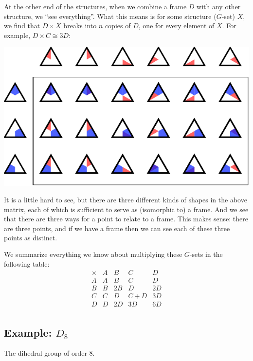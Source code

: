 \documentclass[11pt,oneside]{article}
\newcommand{\thinplus}{\!+\!}
\begin{document}
At the other end of the structures, 
when we combine a frame $D$ with any other structure,
we ``see everything''.
What this means is 
for some structure ($G$-set) $X$, we find that $D\times X$
breaks into $n$ copies of $D$, one for every element of $X$.
For example, $D\times C\cong 3D:$
\begin{center}
\includegraphics[]{pic-triangle-point-frame-matrix.pdf} 
\end{center}
It is a little hard to see, but there are three different
kinds of shapes in the above matrix, 
each of which is sufficient to serve as (isomorphic to) a frame.
And we see that there are three ways for a point to relate to
a frame. This makes sense: there are three points, and if we
have a frame then we can see each of these three points as distinct.

We summarize everything we know about 
multiplying these $G$-sets in the following table:
$$
\begin{array}{r|rrrr}
\times & A & B & C & D \\
\hline
A & A & B & C & D \\
B & B & 2B & D & 2D \\
C & C & D & C\thinplus D & 3D \\
D & D & 2D & 3D & 6D \\
\end{array}
$$

\subsection{Example: $D_8$}

The dihedral group of order 8.
\end{document}
